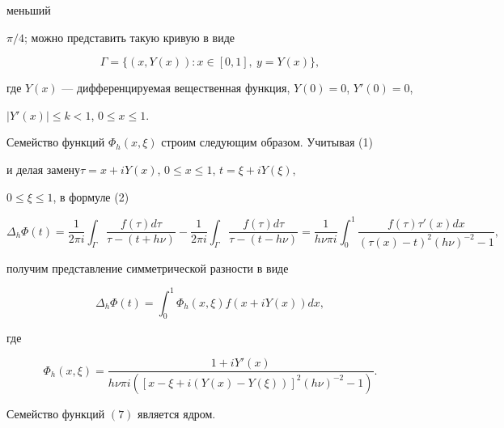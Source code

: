 меньший 


$\pi/4$; можно представить такую кривую в виде 


$$ 


\Gamma=\{(x,Y(x)):x\in[0,1],\ y=Y(x)\}, 


$$ 


где $Y(x)$ --- дифференцируемая вещественная функция, $Y(0)=0$, $Y'(0)=0$, 


$|Y'(x)|\le k<1$, $0\le x\le 1$. 


 


Семейство функций $\Phi_h(x,\xi)$ строим следующим образом. Учитывая (1) 


и делая замену\linebreak $\tau= x+iY(x)$, $0\le x\le1$, $t=\xi+iY(\xi)$,


$0\le\xi\le1$, в формуле (2) 


$$ 


\Delta_h\Phi(t)=\frac{1}{2\pi i}\int_\Gamma 


\frac{f(\tau)d\tau}{\tau-(t+h\nu)}-\frac{1}{2\pi i}\int_\Gamma 


\frac{f(\tau)d\tau}{\tau-(t-h\nu)}=\frac{1}{h\nu\pi i}\int^1_0 


\frac{f(\tau)\tau'(x)dx}{(\tau(x)-t)^2(h\nu)^{-2}-1}, 


$$ 


получим представление симметрической разности в виде 


$$ 


\Delta_h\Phi(t)=\int^1_0\Phi_h(x,\xi) 


f(x+iY(x))dx, 


$$ 


где 


\begin{equation} 


\Phi_h(x,\xi)=\frac{1+iY'(x)} 


{h\nu\pi i([x-\xi+i(Y(x)-Y(\xi))]^2(h\nu)^{-2}-1)}. 


\end{equation} 


 


\begin{lem} 


Семейство функций $(7)$ является ядром. 


\end{lem} 


 



